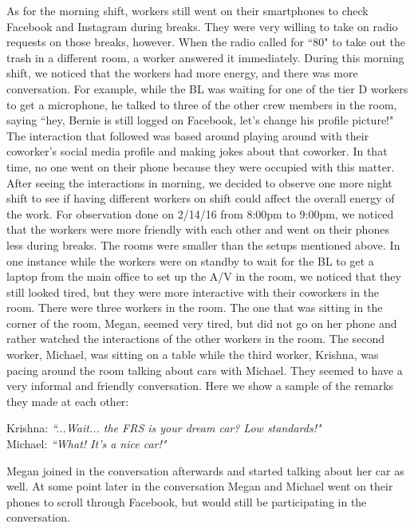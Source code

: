 \documentclass[letterpaper, 12pt]{report}
\begin{document}
	As for the morning shift, workers still went on their smartphones to check Facebook and Instagram during breaks. They were very willing to take on radio requests on those breaks, however. When the radio called for ``80" to take out the trash in a different room, a worker answered it immediately. During this morning shift, we noticed that the workers had more energy, and there was more conversation. For example, while the BL was waiting for one of the tier D workers to get a microphone, he talked to three of the other crew members in the room, saying ``hey, Bernie is still logged on Facebook, let's change his profile picture!" The interaction that followed was based around playing around with their coworker's social media profile and making jokes about that coworker. In that time, no one went on their phone because they were occupied with this matter.\\
	
	After seeing the interactions in morning, we decided to observe one more night shift to see if having different workers on shift could affect the overall energy of the work. For observation done on 2/14/16 from 8:00pm to 9:00pm, we noticed that the workers were more friendly with each other and went on their phones less during breaks. The rooms were smaller than the setups mentioned above. In one instance while the workers were on standby to wait for the BL to get a laptop from the main office to set up the A/V in the room, we noticed that they still looked tired, but they were more interactive with their coworkers in the room.  There were three workers in the room. The one that was sitting in the corner of the room, Megan, seemed very tired, but did not go on her phone and rather watched the interactions of the other workers in the room. The second worker, Michael, was sitting on a table while the third worker, Krishna, was pacing around the room talking about cars with Michael. They seemed to have a very informal and friendly conversation. Here we show a sample of the remarks they made at each other:
		
	\begin{displayquote}
		Krishna: \textit{``...Wait... the FRS is your dream car? Low standards!"}\\
		Michael: \textit{``What! It's a nice car!"}
	\end{displayquote}
	
	Megan joined in the conversation afterwards and started talking about her car as well. At some point later in the conversation Megan and Michael went on their phones to scroll through Facebook, but would still be participating in the conversation.\\
	
\end{document}
